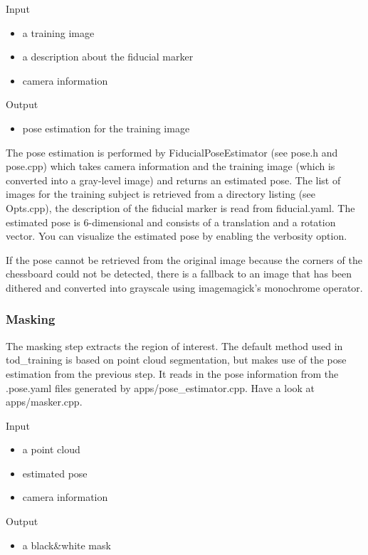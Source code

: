 Input
\begin{itemize}
    \item a training image
    \item a description about the fiducial marker
    \item camera information
\end{itemize}

Output
\begin{itemize}
    \item pose estimation for the training image
\end{itemize}

The pose estimation is performed by FiducialPoseEstimator (see pose.h and
pose.cpp) which takes camera information and the training image (which is
converted into a gray-level image) and returns an estimated pose. The list of
images for the training subject is retrieved from a directory listing (see
Opts.cpp), the description of the fiducial marker is read from fiducial.yaml.
The estimated pose is 6-dimensional and consists of a translation and a
rotation vector. You can visualize the estimated pose by enabling the verbosity
option.

If the pose cannot be retrieved from the original image because the corners
of the chessboard could not be detected, there is a fallback to an image that
has been dithered and converted into grayscale using imagemagick's monochrome
operator.

\subsubsection*{Masking}

The masking step extracts the region of interest. The default method used in
tod\_training is based on point cloud segmentation, but makes use of the pose
estimation from the previous step. It reads in the pose information from the
.pose.yaml files generated by apps/pose\_estimator.cpp. Have a look at
apps/masker.cpp.

Input
\begin{itemize}
    \item a point cloud
    \item estimated pose
    \item camera information
\end{itemize}

Output
\begin{itemize}
    \item a black\&white mask
\end{itemize}

